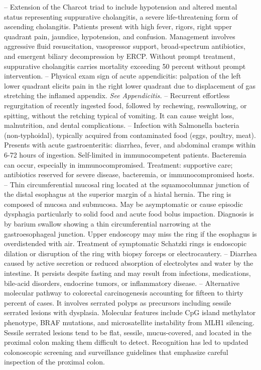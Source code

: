 -- Extension of the Charcot triad to include hypotension and altered mental status representing suppurative cholangitis, a severe life-threatening form of ascending cholangitis. Patients present with high fever, rigors, right upper quadrant pain, jaundice, hypotension, and confusion. Management involves aggressive fluid resuscitation, vasopressor support, broad-spectrum antibiotics, and emergent biliary decompression by ERCP. Without prompt treatment, suppurative cholangitis carries mortality exceeding 50 percent without prompt intervention.
-- Physical exam sign of acute appendicitis: palpation of the left lower quadrant elicits pain in the right lower quadrant due to displacement of gas stretching the inflamed appendix. \textit{See Appendicitis.}
-- Recurrent effortless regurgitation of recently ingested food, followed by rechewing, reswallowing, or spitting, without the retching typical of vomiting. It can cause weight loss, malnutrition, and dental complications.
-- Infection with Salmonella bacteria (non-typhoidal), typically acquired from contaminated food (eggs, poultry, meat). Presents with acute gastroenteritis: diarrhea, fever, and abdominal cramps within 6-72 hours of ingestion. Self-limited in immunocompetent patients. Bacteremia can occur, especially in immunocompromised. Treatment: supportive care; antibiotics reserved for severe disease, bacteremia, or immunocompromised hosts.
-- Thin circumferential mucosal ring located at the squamocolumnar junction of the distal esophagus at the superior margin of a hiatal hernia. The ring is composed of mucosa and submucosa. May be asymptomatic or cause episodic dysphagia particularly to solid food and acute food bolus impaction. Diagnosis is by barium swallow showing a thin circumferential narrowing at the gastroesophageal junction. Upper endoscopy may miss the ring if the esophagus is overdistended with air. Treatment of symptomatic Schatzki rings is endoscopic dilation or disruption of the ring with biopsy forceps or electrocautery.
-- Diarrhea caused by active secretion or reduced absorption of electrolytes and water by the intestine. It persists despite fasting and may result from infections, medications, bile-acid disorders, endocrine tumors, or inflammatory disease.
-- Alternative molecular pathway to colorectal carcinogenesis accounting for fifteen to thirty percent of cases. It involves serrated polyps as precursors including sessile serrated lesions with dysplasia. Molecular features include CpG island methylator phenotype, BRAF mutations, and microsatellite instability from MLH1 silencing. Sessile serrated lesions tend to be flat, sessile, mucus-covered, and located in the proximal colon making them difficult to detect. Recognition has led to updated colonoscopic screening and surveillance guidelines that emphasize careful inspection of the proximal colon.
